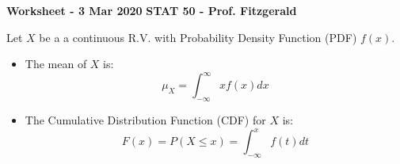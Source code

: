 \documentclass[12pt]{exam}
\begin{document}
\textbf{Worksheet - 3 Mar 2020}
\hfill
\textbf{STAT 50 - Prof. Fitzgerald}



\vspace{5mm}

Let $X$ be a a continuous R.V. with Probability Density Function (PDF) $f(x)$.

\begin{itemize}

\item
The mean of $X$ is:
\[
\mu_X = \int_{-\infty}^{\infty} x f(x) dx
\]

\item
The Cumulative Distribution Function (CDF) for $X$ is:
\[
F(x) = P(X \leq x) = \int_{-\infty}^x f(t) dt
\]

\end{itemize}
\end{document}
